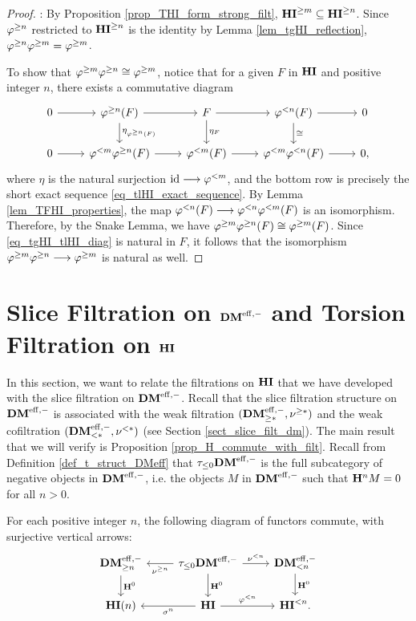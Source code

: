 \begin{proof}
 : By Proposition \ref{prop_THI_form_strong_filt},
$\THI{m} \subseteq \THI{n}$. Since $\tgHI{n}$ restricted to
$\THI{n}$ is the identity by Lemma \ref{lem_tgHI_reflection}, 
$\tgHI{n} \tgHI{m} = \tgHI{m}$. 

To show that $\tgHI{m} \tgHI{n} \cong \tgHI{m}$, notice that
for a given $F$ in $\HI$ and positive integer $n$, there exists a 
commutative diagram
\begin{equation}\label{eq_tgHI_tlHI_diag}
\begin{tikzcd}
0 \arrow{r} &
\tgHI{n}(F) \arrow{r} \arrow{d}{\eta_{\tgHI{n}(F)}} &
F \arrow{r} \arrow{d}{\eta_F} &
\tlHI{n}(F) \arrow{r} \arrow{d}{\cong} &
0 \\
0 \arrow{r} &
\tlHI{m} \tgHI{n}(F) \arrow{r} &
\tlHI{m}(F) \arrow{r} &
\tlHI{m}\tlHI{n}(F) \arrow{r} &
0,
\end{tikzcd}
\end{equation}
where $\eta$ is the natural surjection $\id \to \tlHI{m}$, and
the bottom row is precisely the short exact sequence 
\eqref{eq_tlHI_exact_sequence}. By Lemma 
\ref{lem_TFHI_properties}, the map $\tlHI{n}(F) \to \tlHI{n} 
\tlHI{m}(F)$ is an isomorphism. Therefore, by the Snake Lemma, we 
have $\tgHI{m} \tgHI{n}(F) \cong \tgHI{m}(F)$. Since 
\eqref{eq_tgHI_tlHI_diag} is natural in $F$, it follows that the 
isomorphism $\tgHI{m}\tgHI{n} \to \tgHI{m}$ is natural as well.
\end{proof}

\section{Slice Filtration on $\DMeff$ and Torsion Filtration on $\HI$}
\label{sect_relation_sfilt_tfilt}

In this section, we want to relate the filtrations on $\HI$
that we have developed with the slice filtration on $\DMeff$. 
Recall that the slice filtration structure on $\DMeff$ is 
associated with the weak filtration $(\GFiltDM[*]{\DMeff}, 
\sgDM{*})$ and the weak cofiltration $(\LFiltDM[*]{\DMeff}, 
\slDM{*})$ (see Section \ref{sect_slice_filt_dm}). The main result 
that we will verify is Proposition \ref{prop_H_commute_with_filt}.
Recall from Definition \ref{def_t_struct_DMeff} that 
$\tau_{\leq 0}\DMeff$ is the full subcategory of negative objects in
$\DMeff$, i.e. the objects $M$ in $\DMeff$ such that $\HH^nM = 0$
for all $n > 0$.

\begin{prop}\label{prop_H_commute_with_filt}
For each positive integer $n$, the following diagram of functors 
commute, with surjective vertical arrows:
\[
\begin{tikzcd}
\GFiltDM[n]{\DMeff} \arrow{d}{\HH^0} &
\tau_{\leq 0}\DMeff \arrow{l}{\sgDM{n}} \arrow{r}{\slDM{n}} \arrow{d}{\HH^0} &
\LFiltDM[n]{\DMeff} \arrow{d}{\HH^0} \\
\HI(n) &
\HI \arrow{l}{\sgHI{n}}\arrow{r}{\tlHI{n}} &
\TFHI{n}.
\end{tikzcd}
\]
\end{prop}

